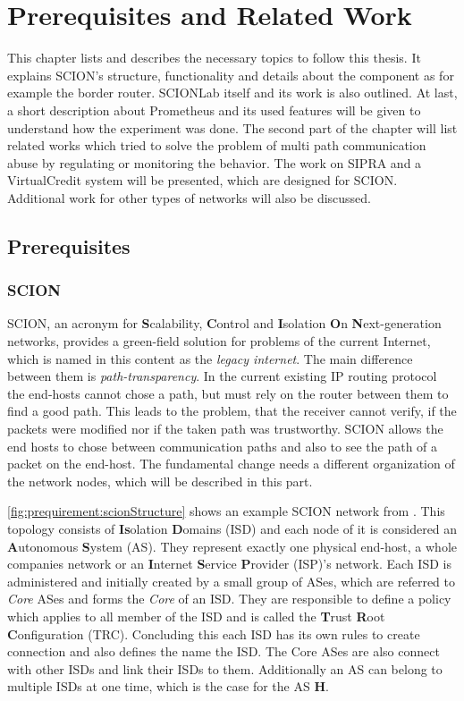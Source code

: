 \documentclass[thesis.tex]{subfiles}
\begin{document}
\chapter{Prerequisites and Related Work}  \label{chap:preqAndRel}

This chapter lists and describes the necessary topics to follow this thesis. It explains SCION's structure, functionality and details about the component as for example the border router. SCIONLab itself and its work is also outlined. At last, a short description about Prometheus and its used features will be given to understand how the experiment was done.
The second part of the chapter will list related works which tried to solve the problem of multi path communication abuse by regulating or monitoring the behavior. The work on SIPRA and a VirtualCredit system will be presented, which are designed for SCION. Additional work for other types of networks will also be discussed.

\section{Prerequisites} \label{chap:preq}

\subsection{SCION} \cite{SCIONPaper, SCIONBook}

SCION, an acronym for \textbf{S}calability, \textbf{C}ontrol and \textbf{I}solation \textbf{O}n \textbf{N}ext-generation networks, provides a green-field solution for problems of the current Internet, which is named in this content as the \textit{legacy internet}. The main difference between them is \textit{path-transparency}. In the current existing IP routing protocol the end-hosts cannot chose a path, but must rely on the router between them to find a good path. This leads to the problem, that the receiver cannot verify, if the packets were modified nor if the taken path was trustworthy. SCION allows the end hosts to chose between communication paths and also to see the path of a packet on the end-host. The fundamental change needs a different organization of the network nodes, which will be described in this part.

\autoref{fig:prequirement:scionStructure} shows an example SCION network from \cite{SCIONPaper}. This topology consists of \textbf{Is}olation \textbf{D}omains (ISD) and each node of it is considered an \textbf{A}utonomous \textbf{S}ystem (AS). They represent exactly one physical end-host, a whole companies network or an \textbf{I}nternet \textbf{S}ervice \textbf{P}rovider (ISP)'s network. Each ISD is administered and initially created by a small group of ASes, which are referred to \textit{Core} ASes and forms the \textit{Core} of an ISD. They are responsible to define a policy which applies to all member of the ISD and is called the \textbf{T}rust \textbf{R}oot \textbf{C}onfiguration (TRC). Concluding this each ISD has its own rules to create connection and also defines the name the ISD. The Core ASes are also connect with other ISDs and link their ISDs to them. Additionally an AS can belong to multiple ISDs at one time, which is the case for the AS \textbf{H}.
\end{document}
